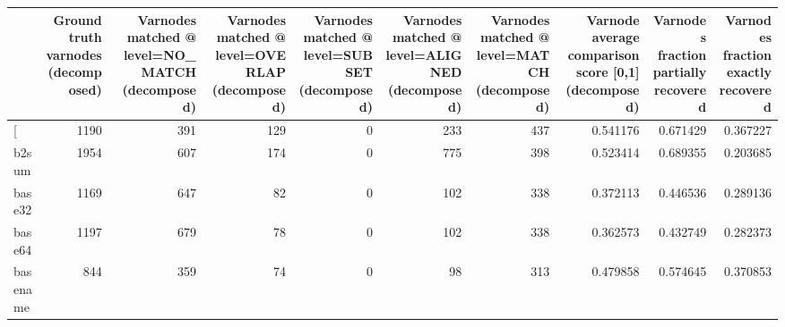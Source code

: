\begin{tabular}{lrrrrrrrrr}
\toprule
{} &  Ground truth varnodes (decomposed) &  Varnodes matched @ level=NO\_MATCH (decomposed) &  Varnodes matched @ level=OVERLAP (decomposed) &  Varnodes matched @ level=SUBSET (decomposed) &  Varnodes matched @ level=ALIGNED (decomposed) &  Varnodes matched @ level=MATCH (decomposed) &  Varnode average comparison score [0,1] (decomposed) &  Varnodes fraction partially recovered &  Varnodes fraction exactly recovered \\
\midrule
[         &                                1190 &                                             391 &                                            129 &                                             0 &                                            233 &                                          437 &                                           0.541176 &                               0.671429 &                             0.367227 \\
b2sum     &                                1954 &                                             607 &                                            174 &                                             0 &                                            775 &                                          398 &                                           0.523414 &                               0.689355 &                             0.203685 \\
base32    &                                1169 &                                             647 &                                             82 &                                             0 &                                            102 &                                          338 &                                           0.372113 &                               0.446536 &                             0.289136 \\
base64    &                                1197 &                                             679 &                                             78 &                                             0 &                                            102 &                                          338 &                                           0.362573 &                               0.432749 &                             0.282373 \\
basename  &                                 844 &                                             359 &                                             74 &                                             0 &                                             98 &                                          313 &                                           0.479858 &                               0.574645 &                             0.370853 \\

\end{tabular}
